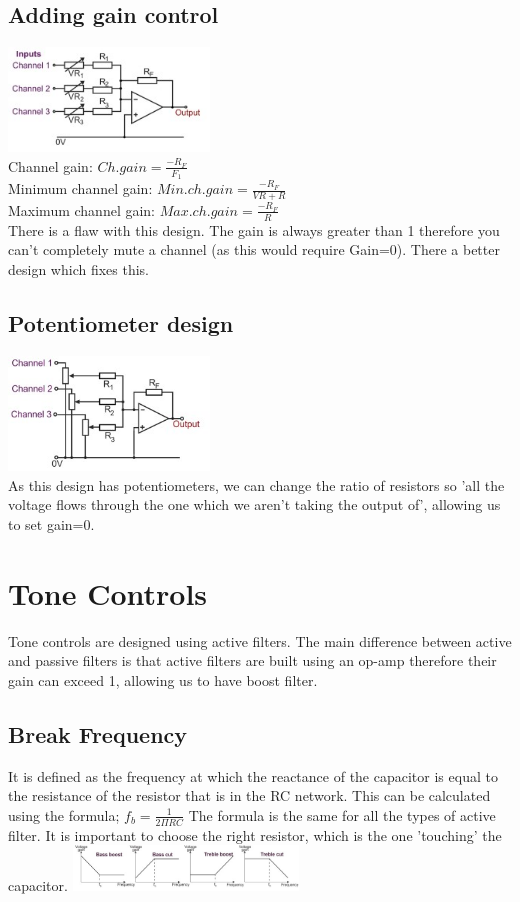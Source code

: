 \documentclass[a4paper, 11pt, twocolumn]{article}
\begin{document}
    \subsection{Adding gain control}
    \includegraphics[width=0.4\textwidth]{summingAmpAddGain.jpg}\\
    Channel gain: $Ch. gain = \frac{-R_F}{F_1}$\\
    Minimum channel gain: $Min. ch. gain = \frac{-R_F}{VR+R}$\\
    Maximum channel gain: $Max. ch. gain = \frac{-R_F}{R}$\\
    There is a flaw with this design. The gain is always greater than 1 therefore you can't completely mute a channel (as this would require Gain=0). There a better design which fixes this.

    \subsection{Potentiometer design}
    \includegraphics[width=0.4\textwidth]{potentAmp.jpg} \\
    As this design has potentiometers, we can change the ratio of resistors so 'all the voltage flows through the one which we aren't taking the output of', allowing us to set gain=0.

    \section{Tone Controls}
    Tone controls are designed using active filters. The main difference between active and passive filters is that active filters are built using an op-amp therefore their gain can exceed 1, allowing us to have boost filter.
    \subsection{Break Frequency}
    It is defined as the frequency at which the reactance of the capacitor is equal to the resistance of the resistor that is in the RC network.
    This can be calculated using the formula; $f_b = \frac{1}{2\Pi RC}$
    The formula is the same for all the types of active filter. It is important to choose the right resistor, which is the one 'touching' the capacitor.
    \includegraphics[width=0.45\textwidth]{activeFilterGraphs.jpg}
\end{document}
